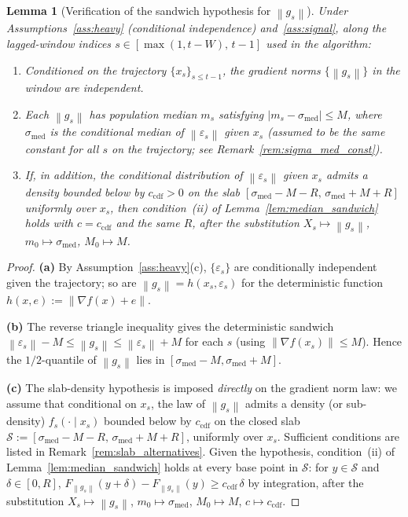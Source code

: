 \documentclass[11pt]{article}
\newtheorem{lemma}[theorem]{Lemma}
\theoremstyle{definition}
\newcommand{\norm}[1]{\left\| #1 \right\|}
\newcommand{\abs}[1]{\left| #1 \right|}
\begin{document}
\begin{lemma}[Verification of the sandwich hypothesis for $\norm{g_s}$]\label{lem:conditioning}
Under Assumptions~\ref{ass:heavy} (conditional independence) and~\ref{ass:signal},
along the lagged-window indices $s \in [\max(1, t-W),\, t-1]$ used in the
algorithm:
\begin{enumerate}[label=\textup{(}\alph*\textup{)},noitemsep,leftmargin=*]
  \item Conditioned on the trajectory $\{x_s\}_{s\leq t-1}$, the gradient norms
    $\{\norm{g_s}\}$ in the window are independent.
  \item Each $\norm{g_s}$ has population median $m_s$ satisfying
    $\abs{m_s - \sigma_{\mathrm{med}}} \leq M$, where
    $\sigma_{\mathrm{med}}$ is the conditional median of $\norm{\varepsilon_s}$
    given $x_s$ (assumed to be the same constant for all $s$ on the trajectory;
    see Remark~\ref{rem:sigma_med_const}).
  \item If, in addition, the conditional distribution of $\norm{\varepsilon_s}$
    given $x_s$ admits a density bounded below by $c_{\mathrm{cdf}}>0$
    on the slab $[\sigma_{\mathrm{med}} - M - R,\, \sigma_{\mathrm{med}} + M + R]$
    uniformly over $x_s$, then condition~(ii) of
    Lemma~\ref{lem:median_sandwich} holds with $c = c_{\mathrm{cdf}}$ and the
    same $R$, after the substitution $X_s \mapsto \norm{g_s}$,
    $m_0 \mapsto \sigma_{\mathrm{med}}$, $M_0 \mapsto M$.
\end{enumerate}
\end{lemma}

\begin{proof}
\textbf{(a)} By Assumption~\ref{ass:heavy}(c), $\{\varepsilon_s\}$ are
conditionally independent given the trajectory; so are
$\norm{g_s} = h(x_s,\varepsilon_s)$ for the deterministic function
$h(x,e):=\norm{\nabla f(x)+e}$.

\textbf{(b)} The reverse triangle inequality gives the deterministic sandwich
$\norm{\varepsilon_s} - M \leq \norm{g_s} \leq \norm{\varepsilon_s} + M$ for
each $s$ (using $\norm{\nabla f(x_s)} \leq M$). Hence the $1/2$-quantile of
$\norm{g_s}$ lies in $[\sigma_{\mathrm{med}} - M, \sigma_{\mathrm{med}} + M]$.

\textbf{(c)} The slab-density hypothesis is imposed \emph{directly} on the
gradient norm law: we assume that conditional on $x_s$, the law of
$\norm{g_s}$ admits a density (or sub-density) $f_s(\cdot\mid x_s)$ bounded
below by $c_{\mathrm{cdf}}$ on the closed slab
$\mathcal S := [\sigma_{\mathrm{med}} - M - R,\, \sigma_{\mathrm{med}} + M + R]$,
uniformly over $x_s$. Sufficient conditions are listed in
Remark~\ref{rem:slab_alternatives}. Given the hypothesis, condition~(ii) of
Lemma~\ref{lem:median_sandwich} holds at every base point in $\mathcal S$:
for $y \in \mathcal S$ and $\delta \in [0, R]$,
$F_{\norm{g_s}}(y + \delta) - F_{\norm{g_s}}(y) \geq c_{\mathrm{cdf}}\,\delta$
by integration, after the substitution
$X_s \mapsto \norm{g_s}$, $m_0 \mapsto \sigma_{\mathrm{med}}$,
$M_0 \mapsto M$, $c \mapsto c_{\mathrm{cdf}}$.
\end{proof}
\end{document}
